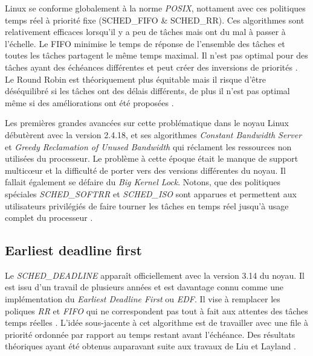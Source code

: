 \documentclass[letterpaper]{article}
\begin{document}
Linux se conforme globalement à la norme \textit{POSIX}, nottament avec ces politiques temps réel à priorité fixe (SCHED\_FIFO \& SCHED\_RR). Ces algorithmes sont relativement efficaces lorsqu'il y a peu de tâches mais ont du mal à passer à l'échelle. Le FIFO minimise le temps de réponse de l'ensemble des tâches et toutes les tâches partagent le même temps maximal. Il n'est pas optimal pour des tâches ayant des échéances différentes et peut créer des inversions de priorités \citep{Klein:1993:PHR:174003}. Le Round Robin est théoriquement plus équitable mais il risque d'être déséquilibré si les tâches ont des délais différents, de plus il n'est pas optimal même si des améliorations ont été proposées \citep{Shreedhar:1995:EFQ:217391.217453}.

Les premières grandes avancées sur cette problématique dans le noyau Linux débutèrent avec la version 2.4.18, et ses algorithmes \textit{Constant Bandwidth Server} \citep{Abeni:1998:IMA:827270.829047} et \textit{Greedy Reclamation of Unused Bandwidth} \citep{Lipari:2000:GRU:1947412.1947445} qui réclament les ressources non utilisées du processeur. Le problème à cette époque était le manque de support multicœur et la difficulté de porter vers des versions différentes du noyau. Il fallait également se défaire du \textit{Big Kernel Lock}. Notons, que des politiques spéciales \textit{SCHED\_SOFTRR} et \textit{SCHED\_ISO} sont apparues et permettent aux utilisateurs privilégiés de faire tourner les tâches en temps réel jusqu'à usage complet du processeur \citep{scordino2006linux}.

\subsection{Earliest deadline first}

Le \textit{SCHED\_DEADLINE} apparaît officiellement avec la version 3.14 du noyau. Il est issu d'un travail de plusieurs années et est davantage connu comme une implémentation du \textit{Earliest Deadline First} ou \textit{EDF}\citep{faggioli2009edf}. Il vise à remplacer les poliques \textit{RR} et \textit{FIFO} qui ne correspondent pas tout à fait aux attentes des tâches temps réelles \citep{buttazzo2011hard}. L'idée sous-jacente à cet algorithme est de travailler avec une file à priorité ordonnée par rapport au temps restant avant l'échéance. Des résultats théoriques ayant été obtenus auparavant suite aux travaux de Liu et Layland \citep{liu1973scheduling}.

\newcommand{\pluseq}{\mathrel{+}=}
\end{document}

